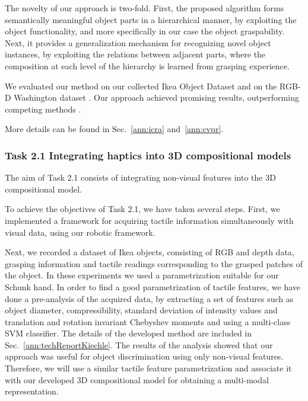 \documentclass[a4paper,11pt,pdf]{pacmanreport}
\begin{document}
The novelty of our approach is two-fold. First, the proposed algorithm forms semantically meaningful object parts in a hierarchical manner, by exploiting the object functionality, and more specifically in our case the object graspability. Next, it provides a generalization mechanism for recognizing novel object instances, by exploiting the relations between adjacent parts, where the composition at each level of the hierarchy is learned from grasping experience.

We evaluated our method on our collected Ikea Object Dataset \cite{website} and on the RGB-D Washington dataset \cite{rgbd-dataset}. Our approach achieved promising results, outperforming competing methods \cite{rel7}.

More details can be found in Sec.~\ref{ann:icra} and~\ref{ann:cvpr}. %


\subsubsection{Task 2.1 Integrating haptics into 3D compositional models}

The aim of Task 2.1 consists of integrating non-visual features into the 3D 
compositional model.

To achieve the objectives of Task 2.1, we have taken several steps. First, we 
implemented a framework for acquiring tactile information simultaneously with 
visual data, using our robotic framework. 

Next, we recorded a dataset of Ikea objects, consisting of RGB and depth data, 
grasping information and tactile readings corresponding to the grasped patches 
of the object. In these experiments we used a parametrization suitable for our 
Schunk hand. In order to find a good parametrization of tactile features, we 
have done a pre-analysis of the acquired data, by extracting a set of features 
such as object diameter, compressibility, standard deviation of intensity values 
and translation and rotation invariant Chebyshev moments and using a multi-class 
SVM classifier. The details of the developed method are included in Sec.~\ref{ann:techReportKiechle}. The results of the analysis showed that our 
approach was useful for object discrimination using only non-visual features. 
Therefore, we will use a similar tactile feature parametrization and associate 
it with our developed 3D compositional model for obtaining a multi-modal 
representation.
\end{document}
